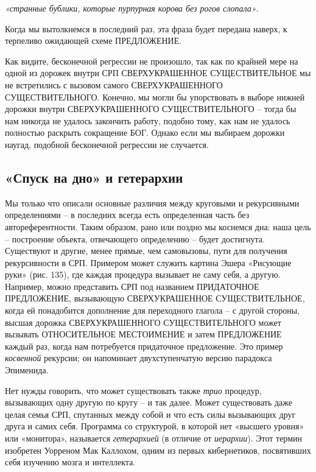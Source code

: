 \documentclass[../main.tex]{subfiles}
\begin{document}
\emph{«странные бублики, которые пурпурная корова без рогов слопала»}.

Когда мы вытолкнемся в последний раз, эта фраза будет передана наверх, к терпеливо ожидающей схеме ПРЕДЛОЖЕНИЕ\@.

Как видите, бесконечной регрессии не произошло, так как по крайней мере на одной из дорожек внутри СРП СВЕРХУКРАШЕННОЕ СУЩЕСТВИТЕЛЬНОЕ мы не встретились с вызовом самого СВЕРХУКРАШЕННОГО СУЩЕСТВИТЕЛЬНОГО\@. Конечно, мы могли бы упорствовать в выборе нижней дорожки внутри СВЕРХУКРАШЕННОГО СУЩЕСТВИТЕЛЬНОГО \--- тогда бы нам никогда не удалось закончить работу, подобно тому, как нам не удалось полностью раскрыть сокращение БОГ\@. Однако если мы выбираем дорожки наугад, подобной бесконечной регрессии не случается.


\subsection{«Спуск на дно» и гетерархии}

Мы только что описали основные различия между круговыми и рекурсивными определениями \--- в последних всегда есть определенная часть без автореферентности. Таким образом, рано или поздно мы коснемся дна: наша цель \--- построение объекта, отвечающего определению \--- будет достигнута. Существуют и другие, менее прямые, чем самовызовы, пути для получения рекурсивности в СРП\@. Примером может служить картина Эшера «Рисующие руки» (рис. 135), где каждая процедура вызывает не саму себя, а другую. Например, можно представить СРП под названием ПРИДАТОЧНОЕ ПРЕДЛОЖЕНИЕ, вызывающую СВЕРХУКРАШЕННОЕ СУЩЕСТВИТЕЛЬНОЕ, когда ей понадобится дополнение для переходного глагола \--- с другой стороны, высшая дорожка СВЕРХУКРАШЕННОГО СУЩЕСТВИТЕЛЬНОГО может вызывать ОТНОСИТЕЛЬНОЕ МЕСТОИМЕНИЕ и затем ПРЕДЛОЖЕНИЕ каждый раз, когда нам потребуется придаточное предложение. Это пример \emph{косвенной} рекурсии; он напоминает двухступенчатую версию парадокса Эпименида.

Нет нужды говорить, что может существовать также \emph{трио} процедур, вызывающих одну другую по кругу \--- и так далее. Может существовать даже целая семья СРП, спутанных между собой и что есть силы вызывающих друг друга и самих себя. Программа со структурой, в которой нет «высшего уровня» или «монитора», называется \emph{гетерархией} (в отличие от \emph{иерархии}). Этот термин изобретен Уорреном Мак Каллохом, одним из первых кибернетиков, посвятивших себя изучению мозга и интеллекта.
\end{document}

